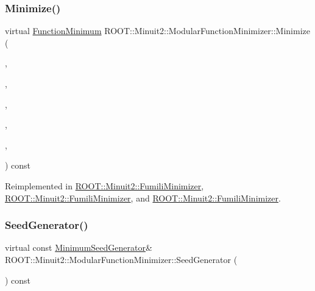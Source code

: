 \subsubsection{\texorpdfstring{Minimize()}{Minimize()}\hspace{0.1cm}{\footnotesize\ttfamily [33/33]}}
{\footnotesize\ttfamily virtual \mbox{\hyperlink{classROOT_1_1Minuit2_1_1FunctionMinimum}{Function\+Minimum}} R\+O\+O\+T\+::\+Minuit2\+::\+Modular\+Function\+Minimizer\+::\+Minimize (\begin{DoxyParamCaption}\item[{const \mbox{\hyperlink{classROOT_1_1Minuit2_1_1MnFcn}{Mn\+Fcn}} \&}]{,  }\item[{const \mbox{\hyperlink{classROOT_1_1Minuit2_1_1GradientCalculator}{Gradient\+Calculator}} \&}]{,  }\item[{const \mbox{\hyperlink{classROOT_1_1Minuit2_1_1MinimumSeed}{Minimum\+Seed}} \&}]{,  }\item[{const \mbox{\hyperlink{classROOT_1_1Minuit2_1_1MnStrategy}{Mn\+Strategy}} \&}]{,  }\item[{unsigned int}]{,  }\item[{double}]{ }\end{DoxyParamCaption}) const\hspace{0.3cm}{\ttfamily [virtual]}}



Reimplemented in \mbox{\hyperlink{classROOT_1_1Minuit2_1_1FumiliMinimizer_ace396e586a17ad934f18b32c8ddd054a}{R\+O\+O\+T\+::\+Minuit2\+::\+Fumili\+Minimizer}}, \mbox{\hyperlink{classROOT_1_1Minuit2_1_1FumiliMinimizer_ace396e586a17ad934f18b32c8ddd054a}{R\+O\+O\+T\+::\+Minuit2\+::\+Fumili\+Minimizer}}, and \mbox{\hyperlink{classROOT_1_1Minuit2_1_1FumiliMinimizer_ace396e586a17ad934f18b32c8ddd054a}{R\+O\+O\+T\+::\+Minuit2\+::\+Fumili\+Minimizer}}.

\mbox{\label{classROOT_1_1Minuit2_1_1ModularFunctionMinimizer_a742930de97b0ce9ba23773874ae0894b}} 
\subsubsection{\texorpdfstring{SeedGenerator()}{SeedGenerator()}\hspace{0.1cm}{\footnotesize\ttfamily [1/3]}}
{\footnotesize\ttfamily virtual const \mbox{\hyperlink{classROOT_1_1Minuit2_1_1MinimumSeedGenerator}{Minimum\+Seed\+Generator}}\& R\+O\+O\+T\+::\+Minuit2\+::\+Modular\+Function\+Minimizer\+::\+Seed\+Generator (\begin{DoxyParamCaption}{ }\end{DoxyParamCaption}) const\hspace{0.3cm}{\ttfamily [pure virtual]}}



